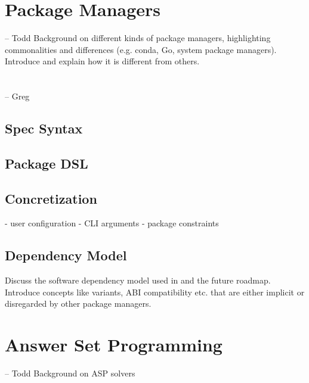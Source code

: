 \section{Package Managers}
-- Todd
Background on different kinds of package managers, highlighting commonalities and differences (e.g. conda, Go, system package managers). Introduce \spack and explain how it is different from others.

\section{\spack}
-- Greg
\subsection{Spec Syntax}

\subsection{Package DSL}

\subsection{Concretization}
- user configuration
- CLI arguments
- package constraints

\subsection{Dependency Model}
Discuss the software dependency model used in \spack and the future roadmap. Introduce concepts like variants, ABI compatibility etc. that are either implicit or disregarded by other package managers.


\section{Answer Set Programming}
-- Todd
Background on ASP solvers

